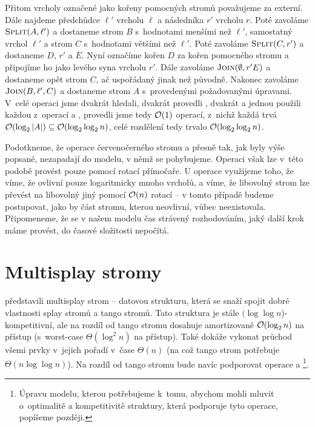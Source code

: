 Přitom vrcholy označené jako kořeny pomocných stromů považujeme za externí.
Dále najdeme předchůdce $\ell'$ vrcholu $\ell$ a následníka $r'$ vrcholu $r$. Poté zavoláme
$\ope{Split}(A, \ell')$ a dostaneme strom $B$ s~hodnotami menšími než $\ell'$,
samostatný vrchol $\ell'$ a strom $C$ s~hodnotami většími než $\ell'$. Poté
zavoláme $\ope{Split}(C,r')$ a dostaneme $D$, $r'$ a $E$. Nyní označíme kořen
$D$ za kořen pomocného stromu a připojíme ho jako levého syna vrcholu $r'$.
Dále zavoláme $\ope{Join}(\emptyset, r' E)$ a dostaneme opět strom $C$, ač
uspořádaný jinak než původně. Nakonec zavoláme $\ope{Join}(B,\ell',C)$ a
dostaneme strom $A$ s~provedenými požadovanými úpravami. V~celé operaci jsme
dvakrát hledali, dvakrát provedli , dvakrát  a jednou
použili každou z~operací  a , provedli jsme tedy $\mathcal O(1)$ operací, z~nichž každá trvá
$\o(\log |A|)\subseteq \o(\log\log n)$, celé rozdělení tedy trvalo
$\o(\log\log n)$.

Podotkneme, že operace červenočerného stromu  a  přesně tak, jak byly výše popsané, nezapadají do modelu, v němž se pohybujeme. Operaci  však lze v~této podobě provést pouze pomocí rotací přímočaře. U operace  využijeme  toho, že víme, že ovlivní pouze logaritmicky mnoho vrcholů, a víme, že libovolný strom lze převést na libovolný jiný pomocí $\mathcal O(n)$ rotací -- v tomto případě budeme postupovat, jako by část stromu, kterou  neovlivní, vůbec neexistovala. Připomeneme, že se v našem modelu čas strávený rozhodováním, jaký další krok máme provést, do časové složitosti nepočítá.

\section{Multisplay stromy}

\citet{multisplay} představili multisplay strom -- datovou strukturu, která se
snaží spojit dobré vlastnosti splay stromů a tango stromů. Tato struktura je
stále $(\log\log n$)-kompetitivní, ale na rozdíl od tango stromu dosahuje
amortizovaně $\o(\log n)$ na přístup (s~worst-case $\Theta(\log^2 n)$ na
přístup). Také dokáže vykonat průchod všemi prvky v~jejich pořadí v~čase
$\Theta(n)$ (na což tango strom potřebuje $\Theta(n\log\log n)$). Na rozdíl
od tango stromu bude navíc podporovat operace  a \footnote{Úpravu modelu,
kterou potřebujeme k~tomu, abychom mohli mluvit o~optimalitě a kompetitivitě
struktury, která podporuje tyto operace, popíšeme později.}.

